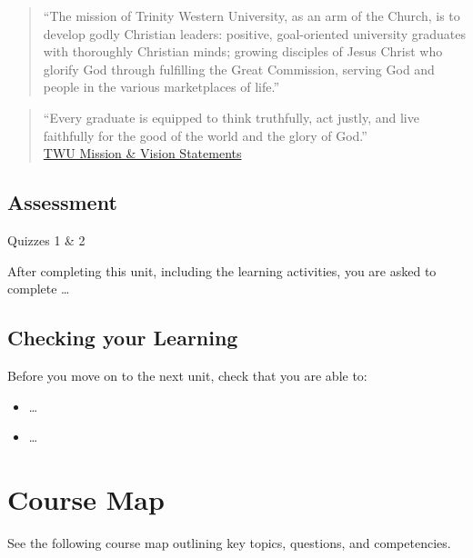 \documentclass[
]{book}
\providecommand{\tightlist}{%
  \setlength{\itemsep}{0pt}\setlength{\parskip}{0pt}}
\theoremstyle{definition}
\theoremstyle{definition}
\theoremstyle{definition}
\theoremstyle{definition}
\theoremstyle{remark}
\begin{document}
\begin{quote}
``The mission of Trinity Western University, as an arm of the Church, is to develop godly Christian leaders: positive, goal-oriented university graduates with thoroughly Christian minds; growing disciples of Jesus Christ who glorify God through fulfilling the Great Commission, serving God and people in the various marketplaces of life.''
\end{quote}

\begin{quote}
``Every graduate is equipped to think truthfully, act justly, and live faithfully for the good of the world and the glory of God.''\\
\href{https://www.twu.ca/about-us/commitments/mission-vision}{TWU Mission \& Vision Statements}
\end{quote}

\hypertarget{assessment-3}{%
\section*{Assessment}\label{assessment-3}}

\begin{assessment}
{Quizzes 1 \& 2}

After completing this unit, including the learning activities, you are asked to complete \ldots{}
\end{assessment}

\hypertarget{checking-your-learning-5}{%
\section*{Checking your Learning}\label{checking-your-learning-5}}

\begin{progress}
Before you move on to the next unit, check that you are able to:

\begin{itemize}
\tightlist
\item
  \ldots{}
\item
  \ldots{}
\end{itemize}
\end{progress}

\hypertarget{course-map}{%
\chapter*{Course Map}\label{course-map}}

See the following course map outlining key topics, questions, and competencies.

  
\end{document}

